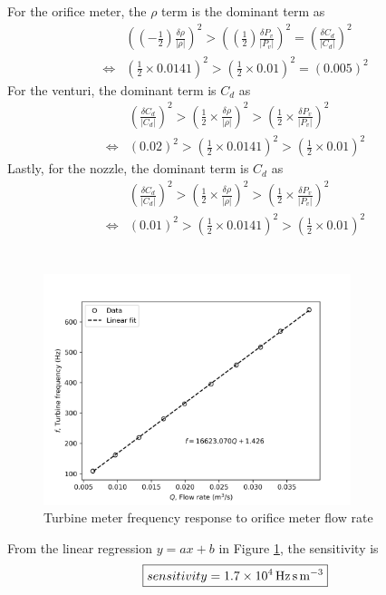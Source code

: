 For the orifice meter, the $\rho$ term is the dominant term as
\begin{align*}
    &\left(\left(-\frac{1}{2}\right)\frac{\delta \rho}{|\rho|}\right)^2 > \left(\left(\frac{1}{2}\right)\frac{\delta P_v}{|P_v|}\right)^2 
    = \left(\frac{\delta C_d}{|C_d|}\right)^2 \\
    \iff &\left(\frac{1}{2}\times 0.0141\right)^2 > \left(\frac{1}{2}\times 0.01\right)^2 = \left(0.005\right)^2
\end{align*}
For the venturi, the dominant term is $C_d$ as 
\begin{align*}
    &\left(\frac{\delta C_d}{|C_d|}\right)^2 > \left(\frac{1}{2}\times \frac{\delta \rho}{|\rho|}\right)^2 > \left(\frac{1}{2}\times \frac{\delta P_v}{|P_v|}\right)^2 \\
    \iff &\left(0.02\right)^2 > \left(\frac{1}{2}\times 0.0141\right)^2 > \left(\frac{1}{2}\times 0.01\right)^2
\end{align*}
Lastly, for the nozzle, the dominant term is $C_d$ as
\begin{align*}
    &\left(\frac{\delta C_d}{|C_d|}\right)^2 > \left(\frac{1}{2}\times \frac{\delta \rho}{|\rho|}\right)^2 > \left(\frac{1}{2}\times \frac{\delta P_v}{|P_v|}\right)^2 \\
    \iff &\left(0.01\right)^2 > \left(\frac{1}{2}\times 0.0141\right)^2 > \left(\frac{1}{2}\times 0.01\right)^2
\end{align*}

\section{}
\begin{figure}[h]
    \centering
    \includegraphics[width=0.8\textwidth]{matplotlib/turbine_calibration.png}
    \caption{Turbine meter frequency response to orifice meter flow rate}
    \label{fig:turbine_meter_calibration}
\end{figure}

From the linear regression $y = ax + b$ in Figure \ref{fig:turbine_meter_calibration}, the sensitivity is
\begin{equation*}
    \boxed{sensitivity = \qty{1.7E4}{\hertz\second\per\meter\cubed}}
\end{equation*}
